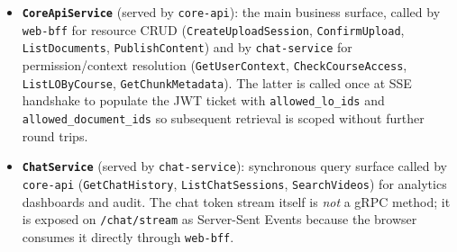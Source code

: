 \begin{itemize}
    \item \textbf{\texttt{CoreApiService}} (served by \texttt{core-api}):
          the main business surface, called by \texttt{web-bff} for
          resource CRUD (\texttt{CreateUploadSession},
          \texttt{ConfirmUpload}, \texttt{ListDocuments},
          \texttt{PublishContent}) and by \texttt{chat-service} for
          permission/context resolution (\texttt{GetUserContext},
          \texttt{CheckCourseAccess}, \texttt{ListLOByCourse},
          \texttt{GetChunkMetadata}). The latter is called once at SSE
          handshake to populate the JWT ticket with
          \texttt{allowed\_lo\_ids} and \texttt{allowed\_document\_ids}
          so subsequent retrieval is scoped without further round trips.
    \item \textbf{\texttt{ChatService}} (served by \texttt{chat-service}):
          synchronous query surface called by \texttt{core-api}
          (\texttt{GetChatHistory}, \texttt{ListChatSessions},
          \texttt{SearchVideos}) for analytics dashboards and audit.
          The chat token stream itself is \emph{not} a gRPC method; it is
          exposed on \texttt{/chat/stream} as Server-Sent Events because
          the browser consumes it directly through \texttt{web-bff}.
\end{itemize}

